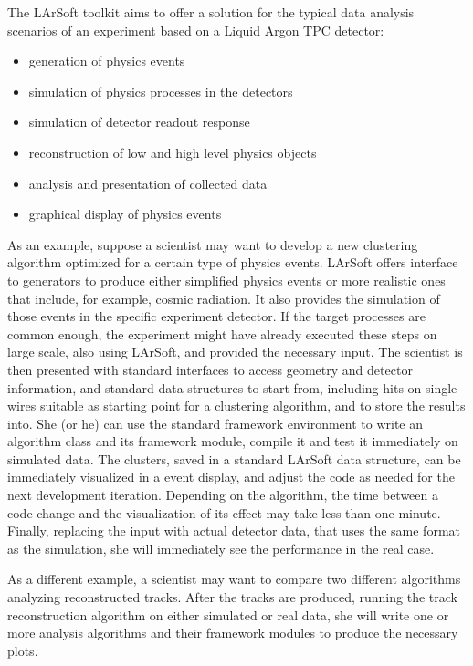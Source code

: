 
% 
% 

The LArSoft toolkit aims to offer a solution for the typical data analysis scenarios
of an experiment based on a Liquid Argon TPC detector:
\begin{itemize}
  \item generation of physics events
  \item simulation of physics processes in the detectors
  \item simulation of detector readout response
  \item reconstruction of low and high level physics objects
  \item analysis and presentation of collected data
  \item graphical display of physics events
\end{itemize}

As an example, suppose a scientist may want to develop a new clustering algorithm
optimized for a certain type of physics events.
LArSoft offers interface to generators to produce either simplified physics events
or more realistic ones that include, for example, cosmic radiation.
It also provides the simulation of those events in the specific experiment detector.
If the target processes are common enough, the experiment might have already
executed these steps on large scale, also using LArSoft, and provided the necessary input.
The scientist is then presented with standard interfaces to access geometry and detector
information, and standard data structures to start from,
including hits on single wires suitable as starting point for a clustering algorithm,
and to store the results into.
She (or he) can use the standard framework environment to write an algorithm class
and its framework module, compile it and test it immediately on simulated data.
The clusters, saved in a standard LArSoft data structure,
can be immediately visualized in a event display,
and adjust the code as needed for the next development iteration.
Depending on the algorithm, the time between a code change and the
visualization of its effect may take less than one minute.
Finally, replacing the input with actual detector data, that uses the same format
as the simulation, she will immediately see the performance in the real case.

As a different example, a scientist may want to compare two different algorithms
analyzing reconstructed tracks.
After the tracks are produced, running the track reconstruction algorithm
on either simulated or real data, she will write one or more analysis algorithms
and their framework modules to produce the necessary plots.

